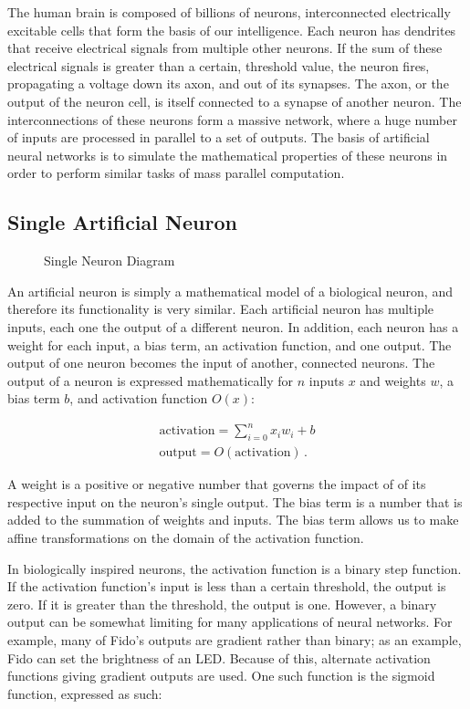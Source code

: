 The human brain is composed of billions of neurons, interconnected electrically excitable cells that form the basis of our intelligence. Each neuron has dendrites that receive electrical signals from multiple other neurons. If the sum of these electrical signals is greater than a certain, threshold value, the neuron fires, propagating a voltage down its axon, and out of its synapses. The axon, or the output of the neuron cell, is itself connected to a synapse of another neuron. The interconnections of these neurons form a massive network, where a huge number of inputs are processed in parallel to a set of outputs. The basis of artificial neural networks is to simulate the mathematical properties of these neurons in order to perform similar tasks of mass parallel computation.


\subsection{Single Artificial Neuron}

\begin{figure}[ht]
	\centering
	
	\caption{Single Neuron Diagram}
\end{figure}

An artificial neuron is simply a mathematical model of a biological neuron, and therefore its functionality is very similar. Each artificial neuron has multiple inputs, each one the output of a different neuron. In addition, each neuron has a weight for each input, a bias term, an activation function, and one output. The output of one neuron becomes the input of another, connected neurons. The output of a neuron is expressed mathematically for $n$ inputs $x$ and weights $w$, a bias term $b$, and activation function $O(x)$:

\begin{align*}
	\text{activation} = \sum_{i=0}^{n}x_i w_i + b\\
	\text{output} = O(\text{activation})
	\,.
\end{align*}

A weight is a positive or negative number that governs the impact of of its respective input on the neuron's single output. The bias term is a number that is added to the summation of weights and inputs. The bias term allows us to make affine transformations on the domain of the activation function. 

In biologically inspired neurons, the activation function is a binary step function. If the activation function's input is less than a certain threshold, the output is zero. If it is greater than the threshold, the output is one. However, a binary output can be somewhat limiting for many applications of neural networks. For example, many of Fido's outputs are gradient rather than binary; as an example, Fido can set the brightness of an LED. Because of this, alternate activation functions giving gradient outputs are used. One such function is the sigmoid function, expressed as such:

